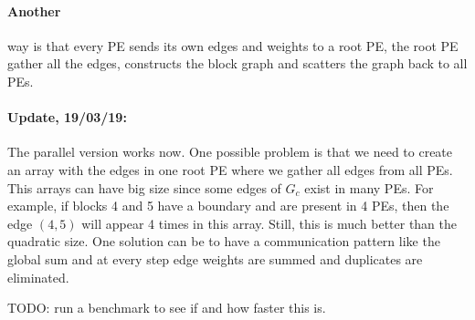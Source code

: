 \documentclass[a4paper,10pt]{article}
\begin{document}
\paragraph*{Another} way is that every PE sends its own edges and weights to a root PE, the root PE gather all the
edges, constructs the block graph and scatters the graph back to all PEs.

\paragraph*{Update, 19/03/19:} The parallel version works now. One possible problem is that we need to create
an array with the edges in one root PE where we gather all edges from all PEs. This arrays can have 
big size since some edges of $G_c$ exist in many PEs. For example, if blocks 4 and 5 have a boundary 
and are present in 4 PEs, then the edge $(4,5)$ will appear 4 times in this array. Still, this
is much better than the quadratic size. One solution can be to have a communication pattern like
the global sum and at every step edge weights are summed and duplicates are eliminated.

TODO: run a benchmark to see if and how faster this is.
\end{document}
